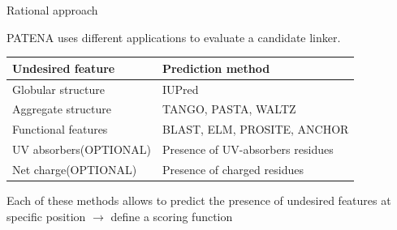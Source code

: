 \documentclass{beamer}
\begin{document}
\begin{frame}{Rational approach}
 
PATENA uses different applications to evaluate a candidate linker.
\vspace{15px}

\begin{tabular}{l|l}
\textbf{Undesired feature} & \textbf{Prediction method} \\ \hline \hline
\rowcolor{Gray} Globular structure & IUPred  \\
Aggregate structure & TANGO, PASTA, WALTZ   \\
\rowcolor{Gray}Functional features & BLAST, ELM, PROSITE, ANCHOR \\  
UV absorbers(OPTIONAL) & Presence of UV-absorbers residues \\
\rowcolor{Gray}Net charge(OPTIONAL)& Presence of charged residues\\
\end{tabular}
 
\vspace{20px} 
Each of these methods allows to predict the presence of undesired features at specific position $\rightarrow$ define a scoring function
 





\end{frame}
\end{document}
